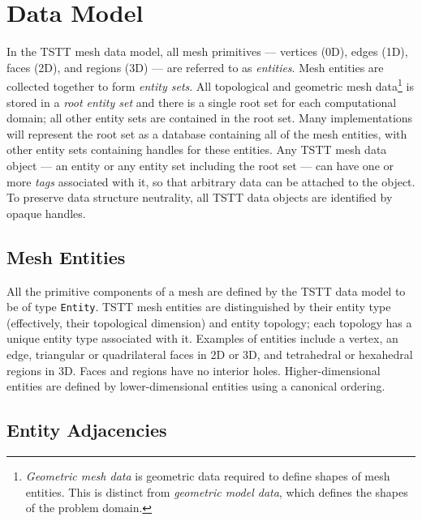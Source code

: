 
\section{Data Model\label{sec:Data-Model}}

In the TSTT mesh data model, all mesh primitives --- vertices (0D),
edges (1D), faces (2D), and regions (3D) --- are referred to as
\emph{entities}.  Mesh entities are collected together to form
\emph{entity sets}. All topological and geometric mesh
data\footnote{\emph{Geometric mesh data} is geometric data required to
define shapes of mesh entities. This is distinct from \emph{geometric
model data}, which defines the shapes of the problem domain.} is stored
in a \emph{root entity set} and there is a single root set for each
computational domain; all other entity sets are contained in the root
set. Many implementations will represent the root set as a database
containing all of the mesh entities, with other entity sets containing
handles for these entities.  Any TSTT mesh data object --- an entity or
any entity set including the root set --- can have one or more
\emph{tags} associated with it, so that arbitrary data can be attached
to the object. To preserve data structure neutrality, all TSTT data
objects are identified by opaque handles.


\subsection{Mesh Entities\label{sub:Mesh-Entities}}

All the primitive components of a mesh are defined by the TSTT data
model to be of type \texttt{Entity}. TSTT mesh entities are
distinguished by their entity type (effectively, their topological
dimension) and entity topology; each topology has a unique entity type
associated with it. Examples of entities include a vertex, an edge,
triangular or quadrilateral faces in 2D or 3D, and tetrahedral or
hexahedral regions in 3D. Faces and regions have no interior holes.
Higher-dimensional entities are defined by lower-dimensional entities
using a canonical ordering.


\subsection{Entity Adjacencies\label{sub:Entity-Adjacencies}}

